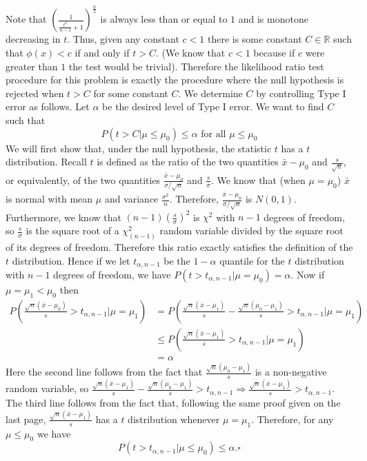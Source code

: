 \documentclass[11pt]{article} %
\begin{document}
Note that $\left(\frac{1}{\frac{t^2}{n-1}+ 1}\right)^{\frac{n}2}$ is always less than or equal to $1$ and is monotone decreasing in $t$. Thus, given any constant $c<1$ there is some constant $C\in \mathbb{R}$ such that $\phi(x)<c$ if and only if $t>C$. (We know that $c<1$ because if $c$ were greater than $1$ the test would be trivial). Therefore the likelihood ratio test procedure for this problem is exactly the procedure where the null hypothesis is rejected when $t>C$ for some constant $C$. We determine $C$ by controlling Type I error as follows. Let $\alpha$ be the desired level of Type I error. We want to find $C$ such that $$P(t>C | \mu \le \mu_0) \le \alpha \text{  for all $\mu\le \mu_0$}$$
We will first show that, under the null hypothesis, the statistic $t$ has a $t$ distribution. Recall $t$ is defined as the ratio of the two quantities $\bar{x} - \mu_0$ and $\frac{s}{\sqrt{n}}$, or equivalently, of the two quantities $\frac{\bar{x}-\mu_0}{\sigma/\sqrt{n}}$ and $\frac{s}{\sigma}$. We know that (when $\mu = \mu_0$) $\bar{x}$ is normal with mean $\mu$ and variance $\frac{\sigma^2 }n$. Therefore, $\frac{\bar{x}-\mu_0}{\sigma/\sqrt{n}}$ is $N(0,1)$. Furthermore, we know that $(n-1)\left(\frac{s}{\sigma}\right)^2$ is $\chi^2$ with $n-1$ degrees of freedom, so $\frac{s}{\sigma}$ is the square root of a $\chi^2_{(n-1)}$ random variable divided by the square root of its degrees of freedom. Therefore this ratio exactly satisfies the definition of the $t$ distribution. Hence if we let $t_{\alpha,n-1}$ be the $1-\alpha$ quantile for the $t$ distribution with $n-1$ degrees of freedom, we have $P(t > t_{\alpha, n-1}| \mu = \mu_0) = \alpha$. Now if $\mu = \mu_1<\mu_0$ then 
\begin{align*}P(\frac{\sqrt{n}(\bar{x}-\mu_0)}{s} > t_{\alpha,n-1} | \mu = \mu_1) &= P(\frac{\sqrt{n}(\bar{x}-\mu_1)}{s}  - \frac{\sqrt{n}(\mu_0 - \mu_1)}{s}> t_{\alpha,n-1} | \mu = \mu_1)\\
& \le P(\frac{\sqrt{n}(\bar{x}-\mu_1)}{s} > t_{\alpha,n-1} | \mu = \mu_1) \\
& = \alpha
\end{align*}
Here the second line follows from the fact that $ \frac{\sqrt{n}(\mu_0 - \mu_1)}{s}$ is a non-negative random variable, so $\frac{\sqrt{n}(\bar{x}-\mu_1)}{s}- \frac{\sqrt{n}(\mu_0 - \mu_1)}{s} > t_{\alpha,n-1} \Rightarrow \frac{\sqrt{n}(\bar{x}-\mu_1)}{s} > t_{\alpha,n-1}$. The third line follows from the fact that, following the same proof given on the last page, $\frac{\sqrt{n}(\bar{x}-\mu_1)}{s}$ has a $t$ distribution whenever $\mu = \mu_1$. Therefore, for any $\mu \le \mu_0$ we have $$P(t>t_{\alpha,n-1} | \mu \le \mu_0) \le \alpha.  \square$$
\end{document}
